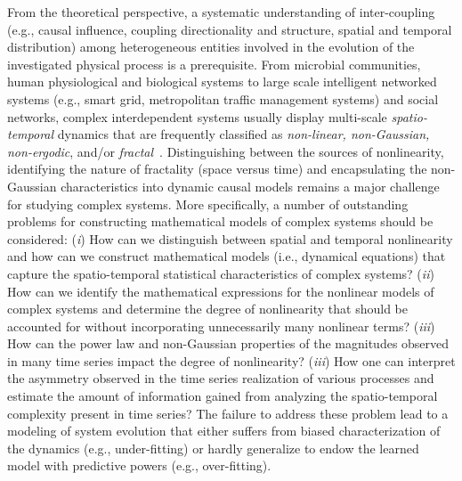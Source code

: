 From the theoretical perspective, a systematic understanding of inter-coupling (e.g., causal influence,  coupling directionality and structure, spatial and temporal distribution) among heterogeneous entities involved in the evolution of the investigated physical process is a prerequisite. From microbial communities, human physiological and biological systems to large scale intelligent networked systems (e.g., smart grid, metropolitan traffic management systems) and social networks, complex interdependent systems usually display multi-scale \textit{spatio-temporal} dynamics that are frequently classified as \textit{non-linear, non-Gaussian, non-ergodic}, and/or \textit{fractal}~\cite{bogdan2015cyber,bogdan2015cyber_2,ghorbani2013cyber,xue2016spatio,kumar2013mobile}. Distinguishing between the sources of nonlinearity, identifying the nature of fractality (space versus time) and encapsulating the non-Gaussian characteristics into dynamic causal models remains a major challenge for studying complex systems. More specifically, a number of outstanding problems for constructing mathematical models of complex systems should be considered: (\textit{i}) How can we distinguish between spatial and temporal nonlinearity and how can we construct mathematical models (i.e., dynamical equations) that capture the spatio-temporal statistical characteristics of complex systems? (\textit{ii}) How can we identify the mathematical expressions for the nonlinear models of complex systems and determine the degree of nonlinearity that should be accounted for without incorporating unnecessarily many nonlinear terms? (\textit{iii}) How can the power law and non-Gaussian properties of the magnitudes observed in many time series impact the degree of nonlinearity? (\textit{iii}) How one can interpret the asymmetry observed in the time series realization of various processes and estimate the amount of information gained from analyzing the spatio-temporal complexity present in time series? The failure to address these problem lead to a modeling of system evolution that either suffers from biased characterization of the dynamics (e.g., under-fitting) or hardly generalize to endow the learned model with predictive powers (e.g., over-fitting).

